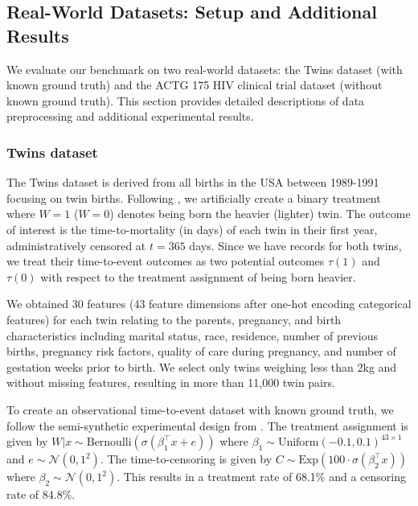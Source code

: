\subsection{Real-World Datasets: Setup and Additional Results} \label{ch04:app:more-real-data-setup-result}
We evaluate our benchmark on two real-world datasets: the Twins dataset (with known ground truth) and the ACTG 175 HIV clinical trial dataset (without known ground truth).
This section provides detailed descriptions of data preprocessing and additional experimental results.

\subsubsection{Twins dataset} \label{ch04:subapp:twin-data-additional-result}
The Twins dataset is derived from all births in the USA between 1989-1991 \citep{almond2005the} focusing on twin births.
Following \citet{curth2021survite}, we artificially create a binary treatment where $W = 1$ ($W = 0$) denotes being born the heavier (lighter) twin.
The outcome of interest is the time-to-mortality (in days) of each twin in their first year, administratively censored at $t = 365$ days.
Since we have records for both twins, we treat their time-to-event outcomes as two potential outcomes $\tau(1)$ and $\tau(0)$ with respect to the treatment assignment of being born heavier.

We obtained 30 features (43 feature dimensions after one-hot encoding categorical features) for each twin relating to the parents, pregnancy, and birth characteristics including marital status, race, residence, number of previous births, pregnancy risk factors, quality of care during pregnancy, and number of gestation weeks prior to birth.
We select only twins weighing less than 2kg and without missing features, resulting in more than 11,000 twin pairs.

To create an observational time-to-event dataset with known ground truth, we follow the semi-synthetic experimental design from \citet{curth2021survite}.
The treatment assignment is given by $W|x \sim \text{Bernoulli}(\sigma(\beta_1^\top x + e))$ where $\beta_1 \sim \text{Uniform}(-0.1, 0.1)^{43 \times 1}$ and $e \sim \mathcal{N}(0, 1^2)$.
The time-to-censoring is given by $C \sim \text{Exp}(100 \cdot \sigma(\beta_2^\top x))$ where $\beta_2 \sim \mathcal{N}(0, 1^2)$.
This results in a treatment rate of 68.1\% and a censoring rate of 84.8\%.

